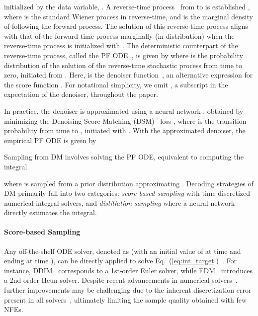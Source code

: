 \documentclass{article} \usepackage{iclr2024_coNFErence,times}
\def\eqref#1{equation~\ref{#1}}
\def\eqref#1{(\ref{#1})}
\def\eqref#1{(\ref{#1})}
\theoremstyle{definition}
\theoremstyle{remark}
\begin{document}
initialized by the data variable, . A reverse-time process~\citep{anderson1982reverse} from  to  is established 
    ,
where  is the standard Wiener process in reverse-time, and  is the marginal density of  following the forward process. The solution of this reverse-time process aligns with that of the forward-time process marginally (in distribution) when the reverse-time process is  initialized with . The deterministic counterpart of the reverse-time process, called the PF ODE~\cite{song2020score}, is given by 
where  is the probability distribution of the solution of the reverse-time stochastic process from time  to zero, initiated from . Here,  is the denoiser function~\citep{efron2011tweedie}, 
an alternative expression for the score function . For notational simplicity, we omit , a subscript in the expectation of the denoiser, throughout the paper. 

In practice, the denoiser  is approximated using a neural network , obtained by minimizing the Denoising Score Matching (DSM)~\citep{vincent2011connection, song2020score} loss 
, where  is the transition probability from time  to , initiated with . With the approximated denoiser, the empirical PF ODE is given by

Sampling from DM involves solving the PF ODE, equivalent to computing the integral

where  is sampled from a prior distribution  approximating . 
Decoding strategies of DM primarily fall into two categories: \emph{score-based sampling} with time-discretized numerical integral solvers, and \emph{distillation sampling} where a neural network directly estimates the integral.


\paragraph{Score-based Sampling}
Any off-the-shelf ODE solver, denoted as  (with an initial value of  at time  and ending at time ), can be directly applied to solve Eq.~\eqref{eq:int_target}~\citep{song2020score}. For instance, DDIM~\citep{song2020denoising} corresponds to a 1st-order Euler solver, while EDM~\citep{karras2022elucidating} introduces a 2nd-order Heun solver. Despite recent advancements in numerical solvers~\citep{lu2022dpm, zhang2022fast}, further improvements may be challenging due to the inherent discretization error present in all solvers~\citep{de2021diffusion}, ultimately limiting the sample quality obtained with few NFEs.
\end{document}
